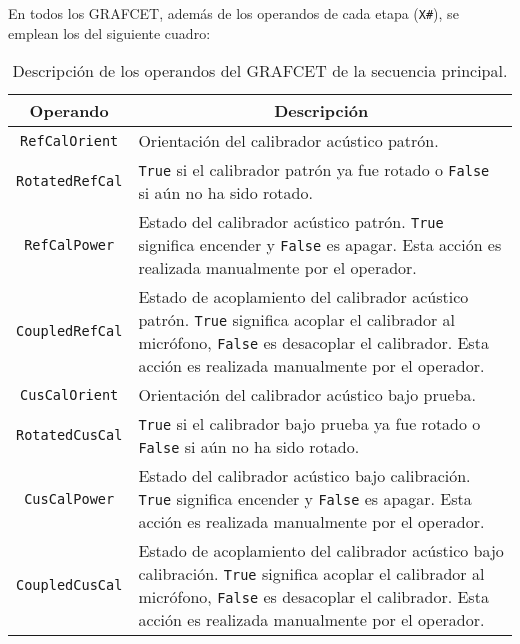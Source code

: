 En todos los GRAFCET, además de los operandos de cada etapa ({\scriptsize \texttt{X\#}}), se emplean los del siguiente cuadro:
%
\begin{table}[!h]
    \caption{Descripción de los operandos del GRAFCET de la secuencia principal.}
    \label{tab:principal_GRAFCET_operands}
    \centering
    \scriptsize
    \begin{tabularx}{\textwidth}{c|X}
        \hline
        \multicolumn{1}{c|}{\textbf{Operando}} & \multicolumn{1}{c}{\textbf{Descripción}}                                        \\ \hline
        {\tiny\texttt{RefCalOrient}}           & Orientación del calibrador acústico patrón.                                     \\ \hline
        {\tiny\texttt{RotatedRefCal}} & {\tiny\texttt{True}} si el calibrador patrón ya fue rotado o
            {\tiny\texttt{False}} si aún no ha sido rotado. \\ \hline
        {\tiny\texttt{RefCalPower}} & Estado del calibrador acústico patrón.
            {\tiny\texttt{True}} significa encender y
            {\tiny\texttt{False}}  es apagar.
        Esta acción es realizada manualmente por el operador. \\ \hline
        {\tiny\texttt{CoupledRefCal}} & Estado de acoplamiento del calibrador acústico patrón.
            {\tiny\texttt{True}} significa acoplar el calibrador al micrófono,
            {\tiny\texttt{False}}  es desacoplar el calibrador.
        Esta acción es realizada manualmente por el operador. \\ \hline
        {\tiny\texttt{CusCalOrient}}           & Orientación del calibrador acústico bajo prueba.                                \\ \hline
        {\tiny\texttt{RotatedCusCal}} & {\tiny\texttt{True}} si el calibrador bajo prueba ya fue rotado o
            {\tiny\texttt{False}} si aún no ha sido rotado. \\ \hline
        {\tiny\texttt{CusCalPower}} & Estado del calibrador acústico bajo calibración.
            {\tiny\texttt{True}} significa encender y
            {\tiny\texttt{False}}  es apagar.
        Esta acción es realizada manualmente por el operador. \\ \hline
        {\tiny\texttt{CoupledCusCal}} & Estado de acoplamiento del calibrador acústico bajo calibración.
            {\tiny\texttt{True}} significa acoplar el calibrador al micrófono,
            {\tiny\texttt{False}}  es desacoplar el calibrador.
        Esta acción es realizada manualmente por el operador. \\ \hline

\end{tabularx}
\end{table}

